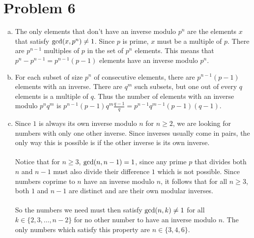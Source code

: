 \documentclass[11pt]{article}
\newcounter{problemnumber}
\let\origleft\left
\let\origright\right
\renewcommand{\left}{\mathopen{}\mathclose\bgroup\origleft}
\renewcommand{\right}{\aftergroup\egroup\origright}
\newcommand{\p}[1]{\left(#1\right)}
\renewcommand{\gcd}[1]{\text{gcd}\p{#1}}
\begin{document}
\section*{Problem 6}
\begin{enumerate}[a)]
\item The only elements that don't have an inverse modulo $p^n$ are the elements $x$ that satisfy $\gcd{x,p^n} \neq 1$. Since $p$ is prime, $x$ must be a multiple of $p$. There are $p^{n-1}$ multiples of $p$ in the set of $p^n$ elements. This means that $p^n - p^{n-1} = p^{n-1}(p-1)$ elements have an inverse modulo $p^n$.
\item For each subset of size $p^n$ of consecutive elements, there are $p^{n-1}(p-1)$ elements with an inverse. There are $q^m$ such subsets, but one out of every $q$ elements is a multiple of $q$. Thus the number of elements with an inverse modulo $p^nq^m$ is $p^{n-1}(p-1)q^m\frac{q-1}q = p^{n-1}q^{m-1}(p-1)(q-1)$.
\item Since $1$ is always its own inverse modulo $n$ for $n\geq 2$, we are looking for numbers with only one other inverse. Since inverses usually come in pairs, the only way this is possible is if the other inverse is its own inverse. \\\\
Notice that for $n\geq 3$, $\gcd{n,n-1}=1$, since any prime $p$ that divides both $n$ and $n-1$ must also divide their difference $1$ which is not possible. Since numbers coprime to $n$ have an inverse modulo $n$, it follows that for all $n\geq 3$, both $1$ and $n-1$ are distinct and are their own modular inverses. \\\\
So the numbers we need must then satisfy $\gcd{n,k}\neq 1$ for all $k \in \{2,3,\ldots,n-2\}$ for no other number to have an inverse modulo $n$. The only numbers which satisfy this property are $n \in \{3,4,6\}$.
\end{enumerate}
\end{document}

